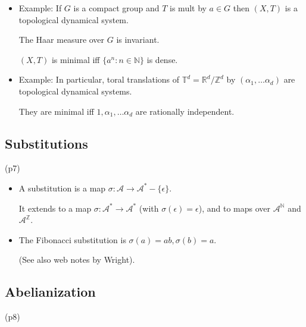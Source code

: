 \documentclass[a4paper,11pt]{amsart}
\begin{document}
\begin{itemize}
\item Example: If $ G $ is a compact group and $ T $ is mult by $ a \in G $ then $ (X,T) $  is a topological dynamical system.

The Haar measure over  $ G $ is invariant.

$ (X,T) $ is minimal iff  $ \{ a^n : n \in \mathbb{N} \} $ is dense.


\item Example: In particular, toral translations of $ \mathbb{T}^d = \mathbb{R} ^d / \mathbb{Z} ^d $ by $ (\alpha_1,\dots \alpha_d ) $ are  topological dynamical systems.  

They are minimal iff $  1,  \alpha_1,\dots \alpha_d  $ are rationally independent.


\end{itemize} 


\subsection{Substitutions} (p7)

\begin{itemize} 
\item A substitution   is a map $ \sigma : \mathcal{A}  \to \mathcal{A}^* -\{\epsilon \} $.  

It extends to a map     $ \sigma : \mathcal{A}^* \to \mathcal{A}^* $ (with $ \sigma (\epsilon ) = \epsilon $),
and to maps over $ \mathcal{A} ^{\mathbb{N}} $ and $ \mathcal{A} ^{\mathbb{Z}} $.

\item The Fibonacci substitution is $ \sigma(a) = ab, \sigma(b) = a $.

(See also web notes by Wright).

\end{itemize} 


\subsection{Abelianization} (p8)
\end{document}
